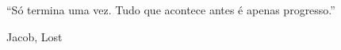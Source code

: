 \null %
\vfill
\epigraph{“Só termina uma vez. Tudo que acontece antes é apenas progresso.”}{Jacob, Lost}

